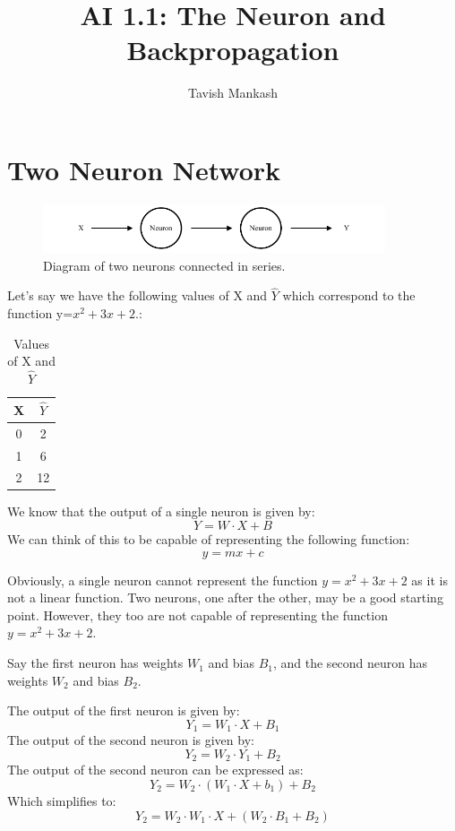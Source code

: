 \documentclass[12pt,a4paper]{article}
\title{AI 1.1: The Neuron and Backpropagation}
\author{Tavish Mankash}
\date{}
\begin{document}
\maketitle

\section{Two Neuron Network}
\begin{figure}[ht]
    \centering
    \includegraphics[width=0.9\textwidth]{../figs/Two_Neuron.drawio.pdf}
    \caption{Diagram of two neurons connected in series.}
    \label{fig:neuron}
\end{figure}

Let's say we have the following values of X and $\hat{Y}$ which correspond to the function y=$x^2 + 3x + 2$.:
\begin{table}[ht]
    \centering
    \begin{tabular}{|c|c|}
        \hline
        X & $\hat{Y}$ \\
        \hline
        0 & 2 \\
        \hline
        1 & 6 \\
        \hline
        2 & 12 \\
        \hline
    \end{tabular}
    \caption{Values of X and $\hat{Y}$}
    \label{tab:x_y_hat}
\end{table}

We know that the output of a single neuron is given by:
\[
    Y = W \cdot X + B
\]
We can think of this to be capable of representing the following function:
\[
    y = mx+c
\]

Obviously, a single neuron cannot represent the function $y=x^2 + 3x + 2$ as it is not a linear function. Two neurons, one after the other, may be a good starting point. However, they too are not capable of representing the function $y=x^2 + 3x + 2$.

Say the first neuron has weights $W_1$ and bias $B_1$, and the second neuron has weights $W_2$ and bias $B_2$. 

The output of the first neuron is given by:
\[
    Y_1 = W_1 \cdot X + B_1
\]
The output of the second neuron is given by:
\[
    Y_2 = W_2 \cdot Y_1 + B_2
\]
The output of the second neuron can be expressed as:
\[
    Y_2 = W_2 \cdot (W_1 \cdot X + b_1) + B_2
\]
Which simplifies to:
\[
    Y_2 = W_2 \cdot W_1 \cdot X + (W_2 \cdot B_1 + B_2)
\]
\end{document}
